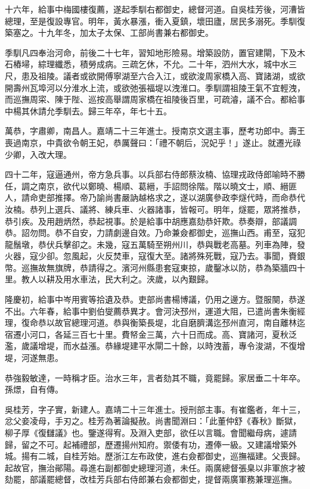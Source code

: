 \begin{pinyinscope}
{{十六年，給事中梅國樓復薦，遂起季馴右都御史，總督河道。自吳桂芳後，河漕皆總理，至是復設專官。明年，黃水暴漲，衝入夏鎮，壞田廬，居民多溺死。季馴復築塞之。十九年冬，加太子太保、工部尚書兼右都御史。

季馴凡四奉治河命，前後二十七年，習知地形險易。增築設防，置官建閘，下及木石樁埽，綜理纖悉，積勞成病。三疏乞休，不允。二十年，泗州大水，城中水三尺，患及祖陵。議者或欲開傅寧湖至六合入江，或欲浚周家橋入高、寶諸湖，或欲開壽州瓦埠河以分淮水上流，或欲弛張福堤以洩淮口。季馴謂祖陵王氣不宜輕洩，而巡撫周寀、陳于陛、巡按高舉謂周家橋在祖陵後百里，可疏濬，議不合。都給事中楊其休請允季馴去。歸三年卒，年七十五。

萬恭，字肅卿，南昌人。嘉靖二十三年進士。授南京文選主事，歷考功郎中。壽王喪過南京，中貴欲令朝王妃，恭厲聲曰：「禮不朝后，況妃乎！」遂止。就遷光祿少卿，入改大理。

四十二年，寇逼通州，帝方急兵事。以兵部右侍郎蔡汝楠、協理戎政侍郎喻時不勝任，調之南京，欲代以鄭曉、楊順、葛縉，手詔問徐階。階以曉文士，順、縉匪人，請命吏部推擇。帝乃諭尚書嚴訥越格求之，遂以湖廣參政李燧代時，而命恭代汝楠。恭列上選兵、議將、練兵車、火器諸事，皆報可。明年，燧罷，眾將推恭，恭引疾。及用趙炳然，恭起視事。於是給事中胡應嘉劾恭奸欺。恭奏辯，部議調恭。詔勿問。恭不自安，力請劇邊自效。乃命兼僉都御史，巡撫山西。甫至，寇犯龍鬚墩，恭伏兵擊卻之。未幾，寇五萬騎至朔州川，恭與戰老高墓。列車為陣，發火器，寇少卻。忽風起，火反焚車，寇復大至。諸將殊死戰，寇乃去。事聞，賚銀幣。巡撫故無旗牌，恭請得之。濱河州縣患套寇東掠，歲鑿冰以防，恭為築牆四十里。教人以耕及用水車法，民大利之。浹歲，以內艱歸。

隆慶初，給事中岑用賓等拾遺及恭。吏部尚書楊博議，仍用之邊方。暨服闋，恭遂不出。六年春，給事中劉伯燮薦恭異才。會河決邳州，運道大阻，已遣尚書朱衡經理，復命恭以故官總理河道。恭與衡築長堤，北自磨臍溝迄邳州直河，南自離林迄宿遷小河口，各延三百七十里。費帑金三萬，六十日而成。高、寶諸河，夏秋泛濫，歲議增堤，而水益漲。恭緣堤建平水閘二十餘，以時洩蓄，專令浚湖，不復增堤，河遂無患。

恭強毅敏達，一時稱才臣。治水三年，言者劾其不職，竟罷歸。家居垂二十年卒。孫燝，自有傳。

吳桂芳，字子實，新建人。嘉靖二十三年進士。授刑部主事。有崔鑑者，年十三，忿父妾凌母，手刃之。桂芳為著論擬赦。尚書聞淵曰：「此董仲舒《春秋》斷獄，柳子厚《復讎議》也。鑒遂得宥。及淵入吏部，欲任以言職。會聞繼母病，遽請歸，留之不可。起補禮部，歷遷揚州知府。禦倭有功，遷俸一級。又建議增築外城。揚有二城，自桂芳始。歷浙江左布政使，進右僉都御史，巡撫福建。父喪歸。起故官，撫治鄖陽。尋進右副都御史總理河道，未任。兩廣總督張臬以非軍旅才被劾罷，部議罷總督，改桂芳兵部右侍郎兼右僉都御史，提督兩廣軍務兼理巡撫。

}}
\end{pinyinscope}
